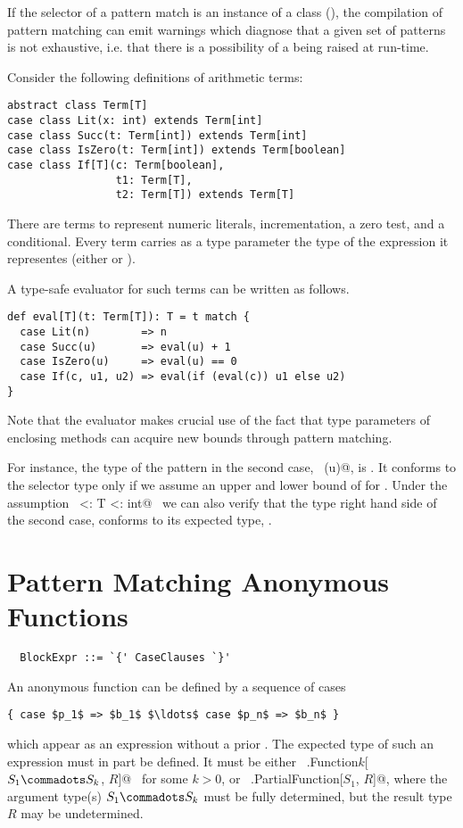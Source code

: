If the selector of a pattern match is an instance of a
\lstinline@sealed@ class (), 
the compilation of pattern matching can emit warnings which diagnose
that a given set of patterns is not exhaustive, i.e. that there is a
possibility of a  being raised at run-time. 

\example\label{ex:eval}
 Consider the following definitions of arithmetic terms:

\begin{lstlisting}
abstract class Term[T]
case class Lit(x: int) extends Term[int]
case class Succ(t: Term[int]) extends Term[int]
case class IsZero(t: Term[int]) extends Term[boolean]
case class If[T](c: Term[boolean],
                 t1: Term[T],
                 t2: Term[T]) extends Term[T]
\end{lstlisting}
There are terms to represent numeric literals, incrementation, a zero
test, and a conditional. Every term carries as a type parameter the
type of the expression it representes (either  or ).

A type-safe evaluator for such terms can be written as follows.
\begin{lstlisting}
def eval[T](t: Term[T]): T = t match {
  case Lit(n)        => n
  case Succ(u)       => eval(u) + 1
  case IsZero(u)     => eval(u) == 0
  case If(c, u1, u2) => eval(if (eval(c)) u1 else u2)
}
\end{lstlisting}
Note that the evaluator makes crucial use of the fact that type
parameters of enclosing methods can acquire new bounds through pattern
matching.

For instance, the type of the pattern in the second case,
~\lstinline@Succ(u)@, is . It conforms to the selector type
 only if we assume an upper and lower bound of  for .
Under the assumption ~\lstinline@int <: T <: int@~ we can also
verify that the type right hand side of the second case, 
conforms to its expected type, .

\section{Pattern Matching Anonymous Functions}
\label{sec:pattern-closures}

\syntax\begin{lstlisting}
  BlockExpr ::= `{' CaseClauses `}'
\end{lstlisting}

An anonymous function can be defined by a sequence of cases 
\begin{lstlisting}
{ case $p_1$ => $b_1$ $\ldots$ case $p_n$ => $b_n$ }
\end{lstlisting}
which appear as an expression without a prior .  The
expected type of such an expression must in part be defined. It must
be either ~\lstinline@scala.Function$k$[$S_1 \commadots S_k$, $R$]@~ for some $k > 0$,
or ~\lstinline@scala.PartialFunction[$S_1$, $R$]@, where the
argument type(s) $S_1 \commadots S_k$ must be fully determined, but the result type
$R$ may be undetermined.

